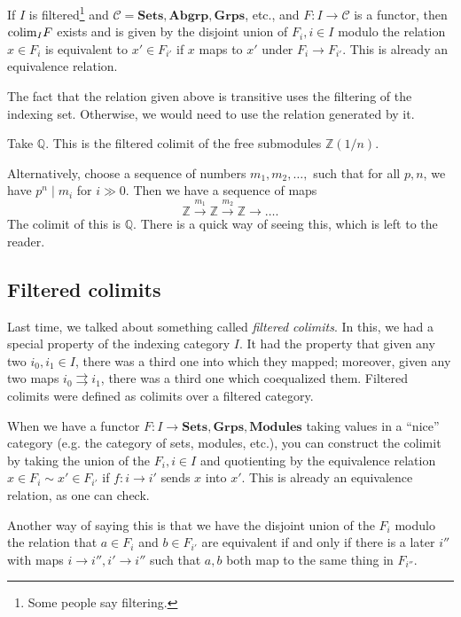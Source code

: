 \begin{proposition} 
If $I$ is filtered\footnote{Some people say filtering.} and $\mathcal{C} =
\mathbf{Sets}, \mathbf{Abgrp}, \mathbf{Grps}$, etc., and $F: I \to \mathcal{C}$
is a functor, then $\mathrm{colim}_I F$ exists and is given by the disjoint union of
$F_i, i \in I$ modulo the relation $x \in F_i$ is equivalent to $x' \in F_{i'}$
if $x$ maps to $x'$ under $F_i \to F_{i'}$. This is already an equivalence
relation. 
\end{proposition} 

The fact that the relation given above is transitive uses the filtering of the
indexing set. Otherwise, we would need to use the relation generated by it. 

\begin{example} 
Take $\mathbb{Q}$. This is the filtered colimit of the free submodules
$\mathbb{Z}(1/n)$.

Alternatively, choose a sequence of numbers $m_1 , m_2, \dots, $ such that for
all $p, n$, we have $p^n \mid m_i$ for $i \gg 0$. Then we have a sequence of
maps
\[ \mathbb{Z} \stackrel{m_1}{\to} \mathbb{Z} \stackrel{m_2}{\to}\mathbb{Z}
\to \dots.   \]
The colimit of this is $\mathbb{Q}$. There is a quick way of seeing this, which
is left to the reader.
\end{example} 

\subsection{Filtered colimits}
Last time, we talked about something called \emph{filtered colimits}. In this,
we had a special property of the indexing category $I$. It had the property
that given any two $i_0, i_1 \in I$, there was a third one into which they
mapped; moreover, given any two maps $i_0 \rightrightarrows i_1$, there was a
third one which coequalized them. Filtered colimits were defined as colimits
over a filtered category. 

When we have a functor $F: I \to \mathbf{Sets}, \mathbf{Grps},
\mathbf{Modules}$ taking values in a ``nice'' category (e.g. the category of
sets, modules, etc.), you can construct the colimit by taking the union of the
$F_i, i \in I$ and quotienting by the equivalence relation $x \in F_i \sim x'
\in F_{i'}$ if $f: i \to i'$ sends $x$ into $x'$. This is already an
equivalence relation, as one can check. 

Another way of saying this is that we have the disjoint union of the $F_i$
modulo the relation that $a \in F_i$ and $b \in F_{i'}$ are equivalent if and
only if there is a later $i''$ with maps $i \to i'', i' \to i''$ such that
$a,b$ both map to the same thing in $F_{i''}$. 


